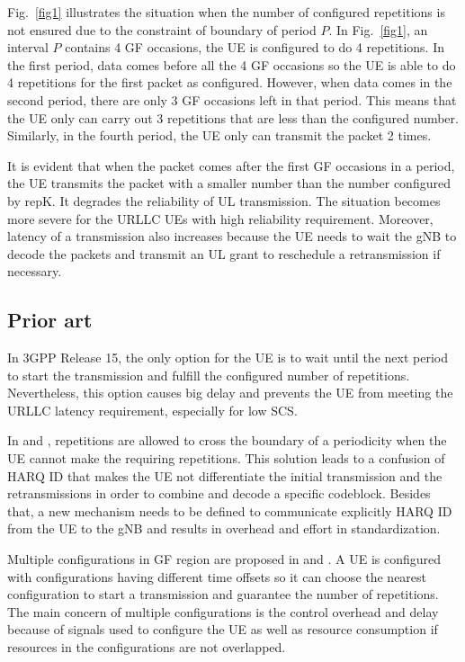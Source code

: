 \documentclass[conference]{IEEEtran}
\begin{document}
Fig.~\ref{fig1} illustrates the situation when the number of configured repetitions is not ensured due to the constraint of boundary of period $P$. In Fig.~\ref{fig1}, an interval $P$ contains 4 GF occasions, the UE is configured to do 4 repetitions. In the first period, data comes before all the 4 GF occasions so the UE is able to do 4 repetitions for the first packet as configured. However, when data comes in the second period, there are only 3 GF occasions left in that period. This means that the UE only can carry out 3 repetitions that are less than the configured number. Similarly, in the fourth period, the UE only can transmit the packet 2 times.

It is evident that when the packet comes after the first GF occasions in a period, the UE transmits the packet with a smaller number than the number configured by repK. It degrades the reliability of UL transmission. The situation becomes more severe for the URLLC UEs with high reliability requirement. Moreover, latency of a transmission also increases because the UE needs to wait the gNB to decode the packets and transmit an UL grant to reschedule a retransmission if necessary.

\subsection{Prior art}\label{ICC}
In 3GPP Release 15, the only option for the UE is to wait until the next period to start the transmission and fulfill the configured number of repetitions. Nevertheless, this option causes big delay and prevents the UE from meeting the URLLC latency requirement, especially for low SCS. 

In \cite{b1} and \cite{b2}, repetitions are allowed to cross the boundary of a periodicity when the UE cannot make the requiring repetitions. This solution leads to a confusion of HARQ ID that makes the UE not differentiate the initial transmission and the retransmissions in order to combine and decode a specific codeblock. Besides that, a new mechanism needs to be defined to communicate explicitly HARQ ID from the UE to the gNB and results in overhead and effort in standardization.  

Multiple configurations in GF region are proposed in \cite{b3} and \cite{b4}. A UE is configured with configurations having different time offsets so it can choose the nearest configuration to start a transmission and guarantee the number of repetitions. The main concern of multiple configurations is the control overhead and delay because of signals used to configure the UE as well as resource consumption if resources in the configurations are not overlapped.
\end{document}
